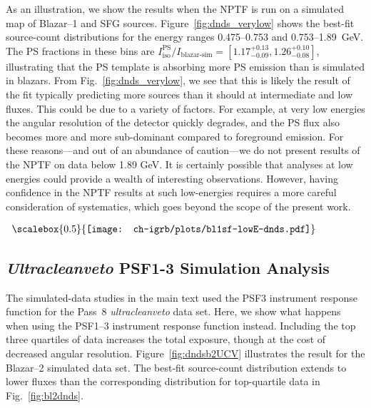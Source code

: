 As an illustration, we show the results when the NPTF is run on a simulated map of Blazar--1 and SFG sources.  Figure~\ref{fig:dnds_verylow} shows the best-fit source-count distributions for the energy ranges 0.475--0.753 and 0.753--1.89~GeV.  The PS fractions in these bins are $I_\text{iso}^\text{PS} / I_\text{blazar-sim} = [1.17_{-0.09}^{+0.13}, 1.26_{-0.08}^{+0.10}]$, illustrating that the PS template is absorbing more PS emission than is simulated in blazars.  From Fig.~\ref{fig:dnds_verylow}, we see that this is likely the result of the fit typically predicting more sources than it should at intermediate and low fluxes.  This could be due to a variety of factors.  For example, 
at very low energies the angular resolution of the detector quickly degrades, and the PS flux also becomes more and more sub-dominant compared to foreground emission.  For these reasons---and out of an abundance of caution---we do not present results of the NPTF on data below 1.89 GeV.  It is certainly possible that analyses at low energies could provide a wealth of interesting observations.  However, having confidence in the NPTF results at such low-energies requires a more careful consideration of systematics, which goes beyond the scope of the present work.  
\begin{figure*}[htbp] %
   	\begin{center}$
	\begin{array}{c}
	\scalebox{0.5}{\texttt{[image: ch-igrb/plots/bl1sf-lowE-dnds.pdf]}} 
	\end{array}$
	\end{center}
\caption{Best-fit source-count distribution for a simulated map containing both Blazar--1 and SFG sources in the 0.475--0.753 textbf{(Left)} and 0.753--1.89 \textbf{(Right)}~GeV energy bins.  (Formatted as in Fig.~\ref{fig:bl1dnds}.) }
   \label{fig:dnds_verylow} 
\end{figure*}

\clearpage
\subsection{{\it Ultracleanveto} PSF1-3 Simulation Analysis}
\label{app:ucvsims}

The simulated-data studies in the main text used the PSF3 instrument response function for the Pass~8 {\it ultracleanveto} data set.  Here, we show what happens when using the PSF1--3 instrument response function instead.  Including the top three quartiles of data increases the total exposure, though at the cost of decreased angular resolution.  Figure~\ref{fig:dndsb2UCV} illustrates the result for the Blazar--2 simulated data set.  The best-fit source-count distribution extends to lower fluxes than the corresponding distribution for top-quartile data in Fig.~\ref{fig:bl2dnds}. 

